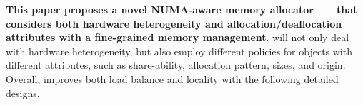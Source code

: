 
\textbf{This paper proposes a novel NUMA-aware memory allocator -- \NM{} -- that considers both hardware heterogeneity and allocation/deallocation attributes with a fine-grained memory management}. \NM{} will not only deal with hardware heterogeneity, but also employ different policies for objects with different attributes, such as share-ability, allocation pattern, sizes, and origin. Overall, \NM{} improves both load balance and locality with the following detailed designs.  


